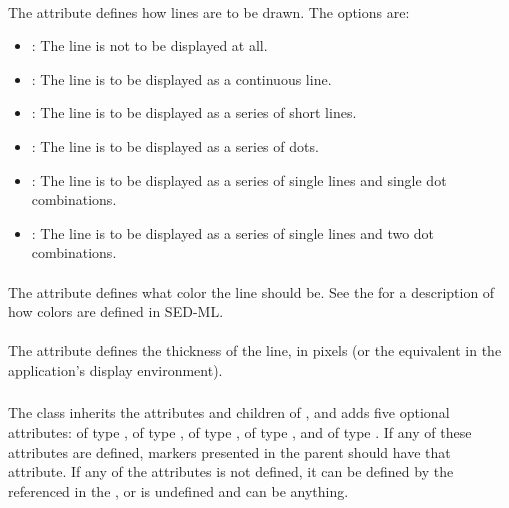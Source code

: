 \begin{blockChanged}
\paragraph*{}

The  attribute defines how lines are to be drawn.  The options are:

\begin{itemize}
        \item \textbf{}: The line is not to be displayed at all.
        \item \textbf{}: The line is to be displayed as a continuous line.
        \item \textbf{}: The line is to be displayed as a series of short lines.
        \item \textbf{}: The line is to be displayed as a series of dots.
        \item \textbf{}: The line is to be displayed as a series of single lines and single dot combinations.
        \item \textbf{}: The line is to be displayed as a series of single lines and two dot combinations.
\end{itemize}

\paragraph*{}

The  attribute defines what color the line should be.  See the \ColorKind for a description of how colors are defined in SED-ML.

\paragraph*{}

The  attribute defines the thickness of the line, in pixels (or the equivalent in the application's display environment).


\subsubsection{}
\label{class:marker}

The \Marker class inherits the attributes and children of \SedBase, and adds five optional attributes:  of type \MarkerKind,  of type ,  of type \ColorKind,  of type \ColorKind, and  of type .  If any of these attributes are defined, markers presented in the parent \Style should have that attribute.  If any of the attributes is not defined, it can be defined by the \Style referenced in the , or is undefined and can be anything.


\end{blockChanged}
